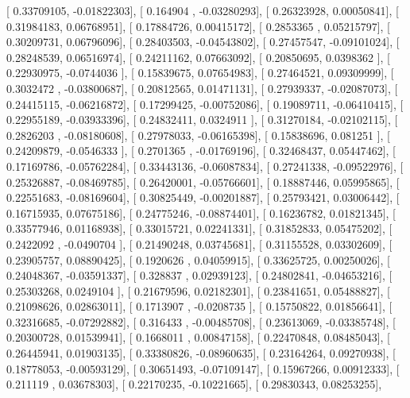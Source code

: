 \documentclass{article}
\begin{document}
       [ 0.33709105, -0.01822303],
       [ 0.164904  , -0.03280293],
       [ 0.26323928,  0.00050841],
       [ 0.31984183,  0.06768951],
       [ 0.17884726,  0.00415172],
       [ 0.2853365 ,  0.05215797],
       [ 0.30209731,  0.06796096],
       [ 0.28403503, -0.04543802],
       [ 0.27457547, -0.09101024],
       [ 0.28248539,  0.06516974],
       [ 0.24211162,  0.07663092],
       [ 0.20850695,  0.0398362 ],
       [ 0.22930975, -0.0744036 ],
       [ 0.15839675,  0.07654983],
       [ 0.27464521,  0.09309999],
       [ 0.3032472 , -0.03800687],
       [ 0.20812565,  0.01471131],
       [ 0.27939337, -0.02087073],
       [ 0.24415115, -0.06216872],
       [ 0.17299425, -0.00752086],
       [ 0.19089711, -0.06410415],
       [ 0.22955189, -0.03933396],
       [ 0.24832411,  0.0324911 ],
       [ 0.31270184, -0.02102115],
       [ 0.2826203 , -0.08180608],
       [ 0.27978033, -0.06165398],
       [ 0.15838696,  0.081251  ],
       [ 0.24209879, -0.0546333 ],
       [ 0.2701365 , -0.01769196],
       [ 0.32468437,  0.05447462],
       [ 0.17169786, -0.05762284],
       [ 0.33443136, -0.06087834],
       [ 0.27241338, -0.09522976],
       [ 0.25326887, -0.08469785],
       [ 0.26420001, -0.05766601],
       [ 0.18887446,  0.05995865],
       [ 0.22551683, -0.08169604],
       [ 0.30825449, -0.00201887],
       [ 0.25793421,  0.03006442],
       [ 0.16715935,  0.07675186],
       [ 0.24775246, -0.08874401],
       [ 0.16236782,  0.01821345],
       [ 0.33577946,  0.01168938],
       [ 0.33015721,  0.02241331],
       [ 0.31852833,  0.05475202],
       [ 0.2422092 , -0.0490704 ],
       [ 0.21490248,  0.03745681],
       [ 0.31155528,  0.03302609],
       [ 0.23905757,  0.08890425],
       [ 0.1920626 ,  0.04059915],
       [ 0.33625725,  0.00250026],
       [ 0.24048367, -0.03591337],
       [ 0.328837  ,  0.02939123],
       [ 0.24802841, -0.04653216],
       [ 0.25303268,  0.0249104 ],
       [ 0.21679596,  0.02182301],
       [ 0.23841651,  0.05488827],
       [ 0.21098626,  0.02863011],
       [ 0.1713907 , -0.0208735 ],
       [ 0.15750822,  0.01856641],
       [ 0.32316685, -0.07292882],
       [ 0.316433  , -0.00485708],
       [ 0.23613069, -0.03385748],
       [ 0.20300728,  0.01539941],
       [ 0.1668011 ,  0.00847158],
       [ 0.22470848,  0.08485043],
       [ 0.26445941,  0.01903135],
       [ 0.33380826, -0.08960635],
       [ 0.23164264,  0.09270938],
       [ 0.18778053, -0.00593129],
       [ 0.30651493, -0.07109147],
       [ 0.15967266,  0.00912333],
       [ 0.211119  ,  0.03678303],
       [ 0.22170235, -0.10221665],
       [ 0.29830343,  0.08253255],
\end{document}
